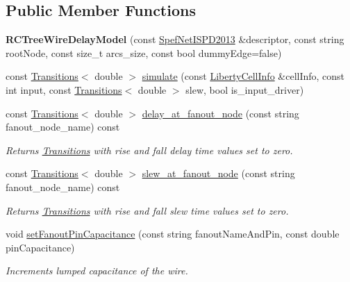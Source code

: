 \subsection*{Public Member Functions}
\begin{DoxyCompactItemize}
\item 
\hypertarget{classRCTreeWireDelayModel_a239d4784b2d39b6042fe39bee4838c6b}{{\bfseries R\-C\-Tree\-Wire\-Delay\-Model} (const \hyperlink{classSpefNetISPD2013}{Spef\-Net\-I\-S\-P\-D2013} \&descriptor, const string root\-Node, const size\-\_\-t arcs\-\_\-size, const bool dummy\-Edge=false)}\label{classRCTreeWireDelayModel_a239d4784b2d39b6042fe39bee4838c6b}

\item 
const \hyperlink{classTransitions}{Transitions}$<$ double $>$ \hyperlink{classRCTreeWireDelayModel_a06312bef3b98f0903335227fd7ea0f31}{simulate} (const \hyperlink{structLibertyCellInfo}{Liberty\-Cell\-Info} \&cell\-Info, const int input, const \hyperlink{classTransitions}{Transitions}$<$ double $>$ slew, bool is\-\_\-input\-\_\-driver)
\item 
const \hyperlink{classTransitions}{Transitions}$<$ double $>$ \hyperlink{classRCTreeWireDelayModel_a7c769d54e8a520db1c5d4537d7e8b608}{delay\-\_\-at\-\_\-fanout\-\_\-node} (const string fanout\-\_\-node\-\_\-name) const 
\begin{DoxyCompactList}\small\item\em Returns \hyperlink{classTransitions}{Transitions} with rise and fall delay time values set to zero. \end{DoxyCompactList}\item 
const \hyperlink{classTransitions}{Transitions}$<$ double $>$ \hyperlink{classRCTreeWireDelayModel_aea4c7315bdd3715ca0c67707b2c32a8c}{slew\-\_\-at\-\_\-fanout\-\_\-node} (const string fanout\-\_\-node\-\_\-name) const 
\begin{DoxyCompactList}\small\item\em Returns \hyperlink{classTransitions}{Transitions} with rise and fall slew time values set to zero. \end{DoxyCompactList}\item 
void \hyperlink{classRCTreeWireDelayModel_a106079b64e0e6b84327fc5a9b4c29a6a}{set\-Fanout\-Pin\-Capacitance} (const string fanout\-Name\-And\-Pin, const double pin\-Capacitance)
\begin{DoxyCompactList}\small\item\em Increments lumped capacitance of the wire. \end{DoxyCompactList}\item 

\end{DoxyCompactItemize}
